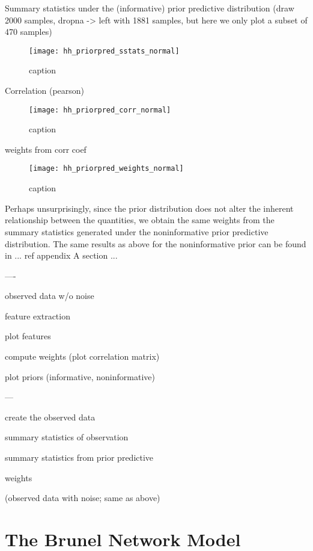 Summary statistics under the (informative) prior predictive distribution (draw 2000 samples, dropna -> left with 1881 samples, but here we only plot a subset of 470 samples)

\begin{figure}[H]
    \centering
    \texttt{[image: hh\_priorpred\_sstats\_normal]}
    \caption{caption}
    \label{fig:fig1}
\end{figure} 


Correlation (pearson) 

\begin{figure}[H]
    \centering
    \texttt{[image: hh\_priorpred\_corr\_normal]}
    \caption{caption}
    \label{fig:fig1}
\end{figure} 

weights from corr coef

\begin{figure}[H]
    \centering
    \texttt{[image: hh\_priorpred\_weights\_normal]}
    \caption{caption}
    \label{fig:fig1}
\end{figure} 

Perhaps unsurprisingly, since the prior distribution does not alter the inherent relationship between the quantities, we obtain the same weights from the summary statistics generated under the noninformative prior predictive distribution. The same results as above for the noninformative prior can be found in ... ref appendix A section ...

%




----

observed data w/o noise 

feature extraction 

plot features 

compute weights (plot correlation matrix) 

plot priors (informative, noninformative)


---

create the observed data

summary statistics of observation 

summary statistics from prior predictive

weights

(observed data with noise; same as above)

\section{The Brunel Network Model}

